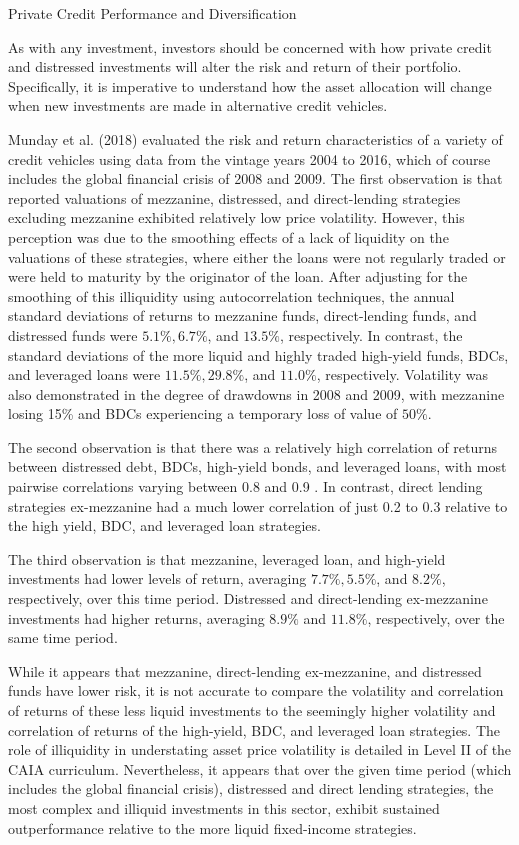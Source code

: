 \documentclass[11pt]{article}
\begin{document}
Private Credit Performance and Diversification

As with any investment, investors should be concerned with how private credit and distressed investments will alter the risk and return of their portfolio. Specifically, it is imperative to understand how the asset allocation will change when new investments are made in alternative credit vehicles.

Munday et al. (2018) evaluated the risk and return characteristics of a variety of credit vehicles using data from the vintage years 2004 to 2016, which of course includes the global financial crisis of 2008 and 2009. The first observation is that reported valuations of mezzanine, distressed, and direct-lending strategies excluding mezzanine exhibited relatively low price volatility. However, this perception was due to the smoothing effects of a lack of liquidity on the valuations of these strategies, where either the loans were not regularly traded or were held to maturity by the originator of the loan. After adjusting for the smoothing of this illiquidity using autocorrelation techniques, the annual standard deviations of returns to mezzanine funds, direct-lending funds, and distressed funds were $5.1 \%, 6.7 \%$, and $13.5 \%$, respectively. In contrast, the standard deviations of the more liquid and highly traded high-yield funds, BDCs, and leveraged loans were $11.5 \%, 29.8 \%$, and $11.0 \%$, respectively. Volatility was also demonstrated in the degree of drawdowns in 2008 and 2009, with mezzanine losing 15\% and BDCs experiencing a temporary loss of value of $50 \%$.

The second observation is that there was a relatively high correlation of returns between distressed debt, BDCs, high-yield bonds, and leveraged loans, with most pairwise correlations varying between 0.8 and 0.9 . In contrast, direct lending strategies ex-mezzanine had a much lower correlation of just 0.2 to 0.3 relative to the high yield, BDC, and leveraged loan strategies.

The third observation is that mezzanine, leveraged loan, and high-yield investments had lower levels of return, averaging $7.7 \%, 5.5 \%$, and $8.2 \%$, respectively, over this time period. Distressed and direct-lending ex-mezzanine investments had higher returns, averaging $8.9 \%$ and $11.8 \%$, respectively, over the same time period.

While it appears that mezzanine, direct-lending ex-mezzanine, and distressed funds have lower risk, it is not accurate to compare the volatility and correlation of returns of these less liquid investments to the seemingly higher volatility and correlation of returns of the high-yield, BDC, and leveraged loan strategies. The role of illiquidity in understating asset price volatility is detailed in Level II of the CAIA curriculum. Nevertheless, it appears that over the given time period (which includes the global financial crisis), distressed and direct lending strategies, the most complex and illiquid investments in this sector, exhibit sustained outperformance relative to the more liquid fixed-income strategies.
\end{document}
